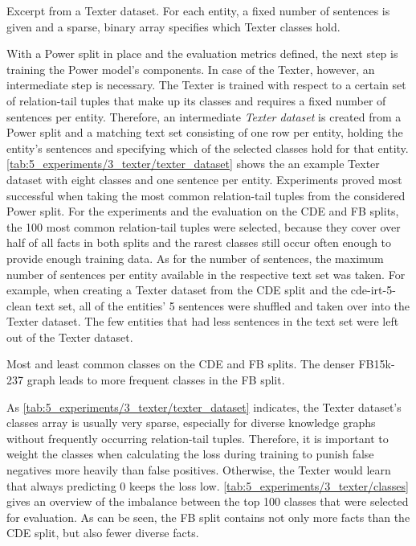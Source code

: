 \begin{table}
    \centering
    
    \caption{Excerpt from a Texter dataset. For each entity, a fixed number of sentences is given and a sparse, binary array specifies which Texter classes hold.}
    \label{tab:5_experiments/3_texter/texter_dataset}
\end{table}

With a Power split in place and the evaluation metrics defined, the next step is training the Power model's components. In case of the Texter, however, an intermediate step is necessary. The Texter is trained with respect to a certain set of relation-tail tuples that make up its classes and requires a fixed number of sentences per entity. Therefore, an intermediate \emph{Texter dataset} is created from a Power split and a matching text set consisting of one row per entity, holding the entity's sentences and specifying which of the selected classes hold for that entity. \autoref{tab:5_experiments/3_texter/texter_dataset} shows the an example Texter dataset with eight classes and one sentence per entity. Experiments proved most successful when taking the most common relation-tail tuples from the considered Power split. For the experiments and the evaluation on the CDE and FB splits, the 100 most common relation-tail tuples were selected, because they cover over half of all facts in both splits and the rarest classes still occur often enough to provide enough training data. As for the number of sentences, the maximum number of sentences per entity available in the respective text set was taken. For example, when creating a Texter dataset from the CDE split and the cde-irt-5-clean text set, all of the entities' 5 sentences were shuffled and taken over into the Texter dataset. The few entities that had less sentences in the text set were left out of the Texter dataset.

\begin{table}[t]
    \centering
    
    \caption{Most and least common classes on the CDE and FB splits. The denser FB15k-237 graph leads to more frequent classes in the FB split.}
    \label{tab:5_experiments/3_texter/classes}
\end{table}

As \autoref{tab:5_experiments/3_texter/texter_dataset} indicates, the Texter dataset's classes array is usually very sparse, especially for diverse knowledge graphs without frequently occurring relation-tail tuples. Therefore, it is important to weight the classes when calculating the loss during training to punish false negatives more heavily than false positives. Otherwise, the Texter would learn that always predicting 0 keeps the loss low. \autoref{tab:5_experiments/3_texter/classes} gives an overview of the imbalance between the top 100 classes that were selected for evaluation. As can be seen, the FB split contains not only more facts than the CDE split, but also fewer diverse facts.

